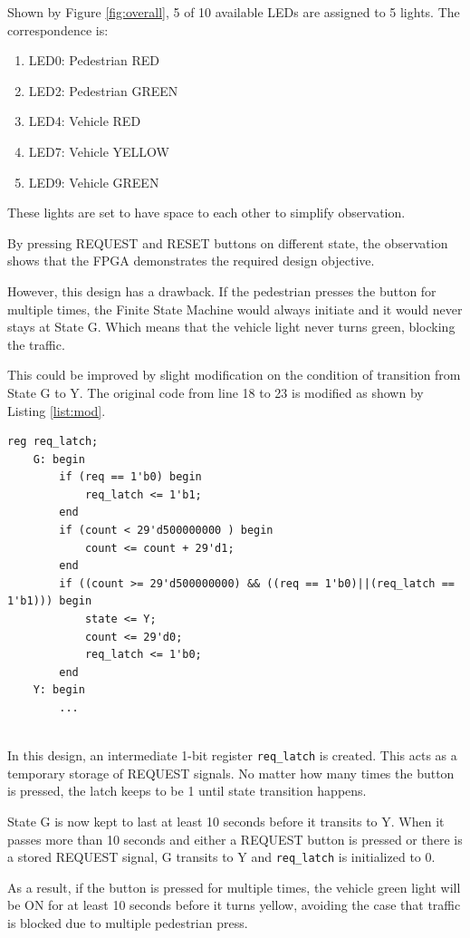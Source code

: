 \documentclass[12pt]{article}
\begin{document}
Shown by Figure \ref{fig:overall}, 5 of 10 available LEDs
are assigned to 5 lights. The correspondence is:
\begin{enumerate}
    \item LED0: Pedestrian RED
    \item LED2: Pedestrian GREEN
    \item LED4: Vehicle RED
    \item LED7: Vehicle YELLOW
    \item LED9: Vehicle GREEN
\end{enumerate}
These lights are set to have space to each other
to simplify observation.

By pressing REQUEST and RESET buttons on different state,
the observation shows that the FPGA demonstrates the 
required design objective.



However, this design has a drawback. If the pedestrian
presses the button for multiple times, the Finite State Machine
would always initiate and it would never stays at State G.
Which means that the vehicle light never turns green, blocking
the traffic.

This could be improved by slight modification on 
the condition of transition from State G to Y.
The original code from line 18 to 
23 is modified as shown by Listing \ref{list:mod}.


\begin{lstlisting}[caption={modified state transition},label={list:mod}]
    reg req_latch;
    G: begin
		if (req == 1'b0) begin
			req_latch <= 1'b1;
		end
		if (count < 29'd500000000 ) begin
			count <= count + 29'd1;
		end 
		if ((count >= 29'd500000000) && ((req == 1'b0)||(req_latch == 1'b1))) begin
			state <= Y;
			count <= 29'd0;
			req_latch <= 1'b0;
		end
    Y: begin
        ...
    
\end{lstlisting}
In this design, an intermediate 1-bit register 
\verb|req_latch| is created. This acts as a 
temporary storage of REQUEST signals. 
No matter how many times the button is pressed, 
the latch keeps to be 1 until state transition happens.

State G is now kept to last at least 10 seconds before it 
transits to Y. When it passes more than 10 seconds and either a 
REQUEST button is pressed or there is a stored REQUEST signal, 
G transits to Y and \verb|req_latch| is initialized to 0.

As a result, if the button is pressed for multiple times, 
the vehicle green light will be ON for at least 10 seconds
before it turns yellow, avoiding the case that 
traffic is blocked due to multiple pedestrian press. 
\end{document}
